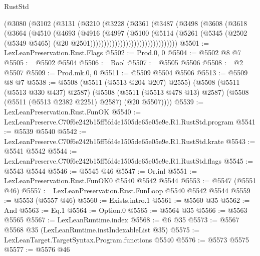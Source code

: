\begin{lexlean}{RustStd}
\begin{coremodule}
                          (@3080
                            (@3102
                              (@3131
                                (@3210
                                  (@3228
                                    (@3361
                                      (@3487
                                        (@3498
                                          (@3608
                                            (@3618
                                              (@3664
                                                (@4510
                                                  (@4693
                                                    (@4916
                                                      (@4997
                                                        (@5100
                                                          (@5114
                                                            (@5261
                                                              (@5345
                                                                (@2502
                                                                  (@5349 @5465)
                                                                  (@20
                                                                    @2501))))))))))))))))))))))))))))))))
@5501 := LexLeanPreservation.Rust.Flags
@5502 := Prod.{0, 0}
@5504 := @5502 @8 @7
@5505 := @5502 @5504
@5506 := Bool
@5507 := @5505 @5506
@5508 := @2 @5507
@5509 := Prod.mk.{0, 0}
@5511 := @5509 @5504 @5506
@5513 := @5509 @8 @7
@5538 := @5508
    (@5511 (@5513 @204 @207) @2555)
    (@5508
      (@5511 (@5513 @330 @437) @2587)
      (@5508 (@5511 (@5513 @478 @13) @2587) (@5508 (@5511 (@5513 @2382 @2251) @2587) (@20 @5507))))
@5539 := LexLeanPreservation.Rust.FunOK
@5540 := LexLeanPreserve.C70f6e242b15ff5fd4e1505de65e05e9e.R1.RustStd.program
@5541 := @5539 @5540
@5542 := LexLeanPreserve.C70f6e242b15ff5fd4e1505de65e05e9e.R1.RustStd.krate
@5543 := @5541 @5542
@5544 := LexLeanPreserve.C70f6e242b15ff5fd4e1505de65e05e9e.R1.RustStd.flags
@5545 := @5543 @5544
@5546 := @5545 @46
@5547 := Or.inl
@5551 := LexLeanPreservation.Rust.FunOK0 @5540 @5542 @5544
@5553 := @5547 (@5551 @46)
@5557 := LexLeanPreservation.Rust.FunLoop @5540 @5542 @5544
@5559 := @5553 (@5557 @46)
@5560 := Exists.intro.{1}
@5561 := @5560 @35
@5562 := And
@5563 := Eq.{1}
@5564 := Option.{0}
@5565 := @5564 @35
@5566 := @5563 @5565
@5567 := LexLeanRuntime.index
@5568 := @6 @35
@5573 := @5567 @5568 @35 (LexLeanRuntime.instIndexableList @35)
@5575 := LexLeanTarget.TargetSyntax.Program.functions @5540
@5576 := @5573 @5575
@5577 := @5576 @46

\end{coremodule}
\end{lexlean}
